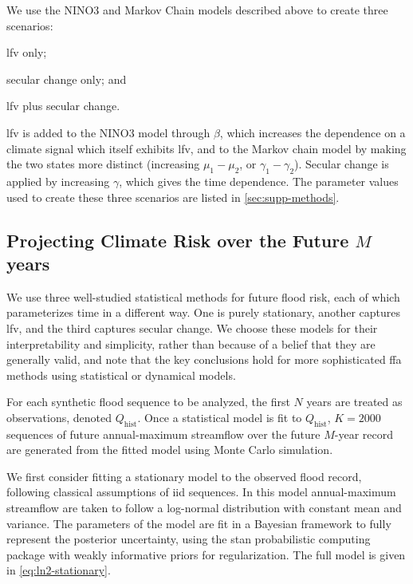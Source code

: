 \documentclass[
]{agujournal2018}
\begin{document}
We use the NINO3 and Markov Chain models described above to create three scenarios:
\begin{enumerate*}[label= (\roman*)]
  \item \gls{lfv} only;
  \item secular change only; and
  \item \gls{lfv} plus secular change.
\end{enumerate*}
\gls{lfv} is added to the NINO3 model through $\beta$, which increases the dependence on a climate signal which itself exhibits \gls{lfv}, and to the Markov chain model by making the two states more distinct (increasing $\mu_1 - \mu_2$, or $\gamma_1 - \gamma_2$).
Secular change is applied by increasing $\gamma$, which gives the time dependence.
The parameter values used to create these three scenarios are listed in \cref{sec:supp-methods}.

\subsection{Projecting Climate Risk over the Future $M$ years}\label{sec:methods-estimating}


We use three well-studied statistical methods for future flood risk, each of which parameterizes time in a different way.
One is purely stationary, another captures \gls{lfv}, and the third captures secular change.
We choose these models for their interpretability and simplicity, rather than because of a belief that they are generally valid, and note that the key conclusions hold for more sophisticated \gls{ffa} methods using statistical or dynamical models.

For each synthetic flood sequence to be analyzed, the first $N$ years are treated as observations, denoted $Q_{\text{hist}}$.
Once a statistical model is fit to $Q_{\text{hist}}$, $K=\num{2000}$ sequences of future annual-maximum streamflow over the future $M$-year record are generated from the fitted model using Monte Carlo simulation.

We first consider fitting a stationary model to the observed flood record, following classical assumptions of \gls{iid} sequences.
In this model annual-maximum streamflow are taken to follow a log-normal distribution with constant mean and variance.
The parameters of the model are fit  in a Bayesian framework to fully represent the posterior uncertainty, using the stan probabilistic computing package \citep{Carpenter:2017ke} with weakly informative priors for regularization.
The full model is given in \cref{eq:ln2-stationary}.
\end{document}

